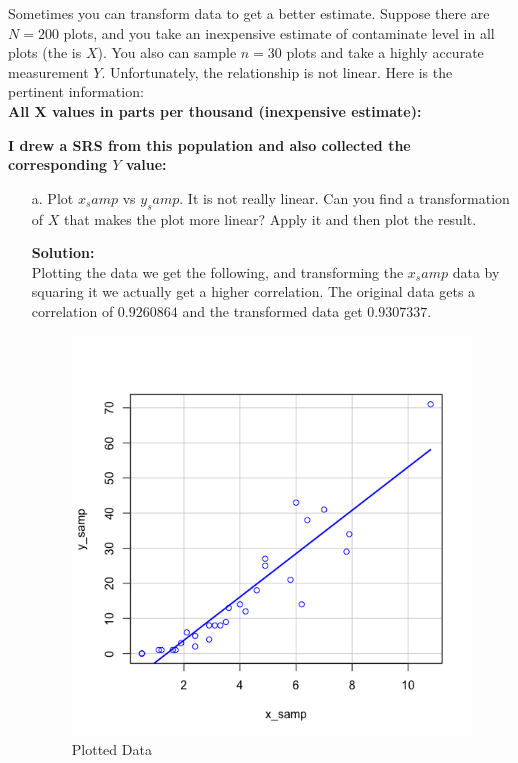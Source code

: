\documentclass[12pt]{article}
\makeatletter
\theoremstyle{homework}
\newenvironment{exercise}[1]
{\def\@currentlabel{#1}\exercisecore}
{\endexercisecore}
\newcommand{\localhead}[1]{\par\smallskip\noindent\textbf{#1}\nobreak\\}%
\newcommand\solution{\localhead{Solution:}}
\makeatother
\begin{document}
\begin{exercise}{4.} Sometimes you can transform data to get a better estimate. Suppose there are $N = 200$ 
  plots, and you take an inexpensive estimate of contaminate level in all plots (the is $X$). You also can 
  sample $n = 30$ plots and take a highly accurate measurement $Y$. Unfortunately, the relationship is not 
  linear. Here is the pertinent information:\\
  \textbf{All X values in parts per thousand (inexpensive estimate):}
  \begin{center}
 
  \end{center}
  \textbf{I drew a SRS from this population and also collected the corresponding $Y$ value:}
  \begin{center}
 
  \end{center}
  \begin{enumerate}
    \item[a.] Plot $x_samp$ vs $y_samp$. It is not really linear. Can you find a transformation 
    of $X$ that makes the plot more linear? Apply it and then plot the result.\\
    \solution Plotting the data we get the following, and transforming the $x_samp$ data 
    by squaring it we actually get a higher correlation. The original data gets a correlation of 
    $0.9260864$ and the transformed data get $0.9307337$.
    \begin{figure}[H]
      \begin{center}
      \caption{Plotted Data}
      \includegraphics[width=.63\textwidth]{Rplot1.png}
      \end{center}
  \end{figure}
  \begin{figure}[H]

\end{figure}
\end{enumerate}
\end{exercise}
\end{document}

